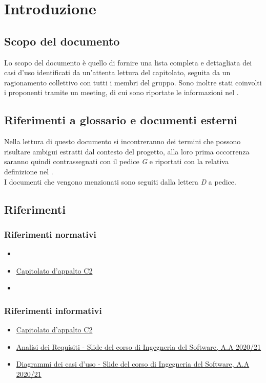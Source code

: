 \section{Introduzione}
\subsection{Scopo del documento}
Lo scopo del documento è quello di fornire una lista completa e dettagliata dei casi d'uso identificati
da un'attenta lettura del capitolato, seguita da un ragionamento collettivo con tutti i membri del gruppo.
Sono inoltre stati coinvolti i proponenti tramite un meeting, di cui sono riportate le informazioni nel .

\subsection{Riferimenti a glossario e documenti esterni}
Nella lettura di questo documento si incontreranno dei termini che possono risultare ambigui estratti dal contesto
del progetto, alla loro prima occorrenza saranno quindi contrassegnati con il pedice \textit{G} e riportati con la relativa definizione nel . \\
I documenti che vengono menzionati sono seguiti dalla lettera \textit{D} a pedice.

\subsection{Riferimenti}
\subsubsection{Riferimenti normativi}
\begin{itemize}
    \item {}
    \item \href{https://www.math.unipd.it/~tullio/IS-1/2020/Progetto/C2.pdf}{Capitolato d'appalto C2}
    \item {}
\end{itemize}

\subsubsection{Riferimenti informativi}
\begin{itemize}
    \item \href{https://www.math.unipd.it/~tullio/IS-1/2020/Progetto/C2.pdf}{Capitolato d'appalto C2}
    \item \href{https://www.math.unipd.it/~tullio/IS-1/2020/Dispense/L07.pdf}{Analisi dei Requisiti - Slide del corso di Ingegneria del Software, A.A 2020/21}
    \item \href{https://www.math.unipd.it/~rcardin/swea/2021/Diagrammi%20Use%20Case_4x4.pdf}{Diagrammi dei casi d'uso - Slide del corso di Ingegneria del Software, A.A 2020/21}
    
\end{itemize}
